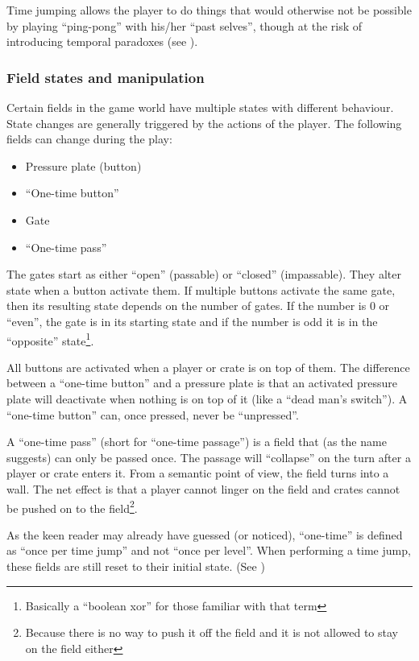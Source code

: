 Time jumping allows the player to do things that would otherwise not
be possible by playing ``ping-pong'' with his/her ``past selves'',
though at the risk of introducing temporal paradoxes (see
).

\subsubsection{Field states and manipulation}
\label{field-states}
Certain fields in the game world have multiple states with different
behaviour.  State changes are generally triggered by the actions of
the player.  The following fields can change during the play:

\begin{itemize}
\item Pressure plate (button)
\item ``One-time button''
\item Gate
\item ``One-time pass''
\end{itemize}

The gates start as either ``open'' (passable) or ``closed''
(impassable).  They alter state when a button activate them.  If
multiple buttons activate the same gate, then its resulting state
depends on the number of gates.  If the number is 0 or ``even'', the
gate is in its starting state and if the number is odd it is in the
``opposite'' state\footnote{Basically a ``boolean xor'' for those
  familiar with that term}.

All buttons are activated when a player or crate is on top of them.
The difference between a ``one-time button'' and a pressure plate is
that an activated pressure plate will deactivate when nothing is on
top of it (like a ``dead man's switch'').  A ``one-time button'' can,
once pressed, never be ``unpressed''.

A ``one-time pass'' (short for ``one-time passage'') is a field that
(as the name suggests) can only be passed once.  The passage will
``collapse'' on the turn after a player or crate enters it.  From a
semantic point of view, the field turns into a wall.  The net effect
is that a player cannot linger on the field and crates cannot be pushed
on to the field\footnote{Because there is no way to push it off the field
and it is not allowed to stay on the field either}.

As the keen reader may already have guessed (or noticed), ``one-time''
is defined as ``once per time jump'' and not ``once per level''.  When
performing a time jump, these fields are still reset to their initial
state.  (See )


